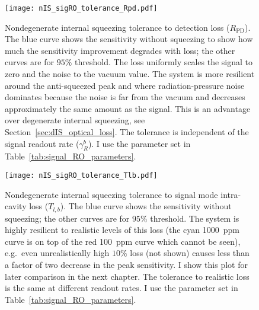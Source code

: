 \begin{figure}
    \centering
    \texttt{[image: nIS\_sigRO\_tolerance\_Rpd.pdf]}
    \caption{ Nondegenerate internal squeezing tolerance to detection loss ($R_\text{PD}$). The blue curve shows the sensitivity without squeezing to show how much the sensitivity improvement degrades with loss; the other curves are for $95\%$ threshold. The loss uniformly scales the signal to zero and the noise to the vacuum value. The system is more resilient around the anti-squeezed peak and where radiation-pressure noise dominates because the noise is far from the vacuum and decreases approximately the same amount as the signal. This is an advantage over degenerate internal squeezing, see Section~\ref{sec:dIS_optical_loss}. The tolerance is independent of the signal readout rate ($\gamma^b_R$). I use the parameter set in Table~\ref{tab:signal_RO_parameters}.}
    \label{fig:nIS_sigRO_tolerance_Rpd}
\end{figure}
\begin{figure}
    \centering
    \texttt{[image: nIS\_sigRO\_tolerance\_Tlb.pdf]}
    \caption{ Nondegenerate internal squeezing tolerance to signal mode intra-cavity loss ($T_{l,b}$). The blue curve shows the sensitivity without squeezing; the other curves are for $95\%$ threshold.
    The system is highly resilient to realistic levels of this loss (the cyan 1000~ppm curve is on top of the red 100~ppm curve which cannot be seen), e.g.\ even unrealistically high $10\%$ loss (not shown) causes less than a factor of two decrease in the peak sensitivity. I show this plot for later comparison in the next chapter. The tolerance to realistic loss is the same at different readout rates. I use the parameter set in Table~\ref{tab:signal_RO_parameters}.
    }
    \label{fig:nIS_sigRO_tolerance_Tlb}
\end{figure}
